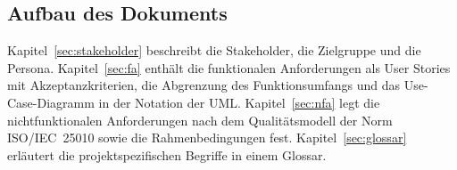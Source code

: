 \subsection{Aufbau des Dokuments}
Kapitel~\ref{sec:stakeholder} beschreibt die Stakeholder, die Zielgruppe und die Persona. Kapitel~\ref{sec:fa} enthält die funktionalen Anforderungen als User Stories mit Akzeptanzkriterien, die Abgrenzung des Funktionsumfangs und das Use-Case-Diagramm in der Notation der \ac{UML}. Kapitel~\ref{sec:nfa} legt die nichtfunktionalen Anforderungen nach dem Qualitätsmodell der Norm \acs{ISO}/\acs{IEC}~25010 sowie die Rahmenbedingungen fest. Kapitel~\ref{sec:glossar} erläutert die projektspezifischen Begriffe in einem Glossar.
